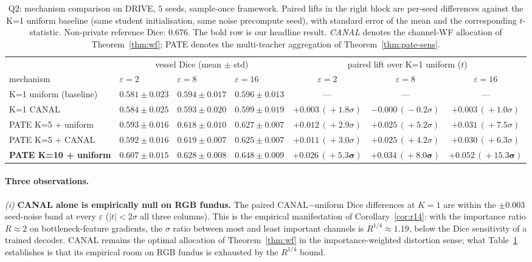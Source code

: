 \begin{table}[t]
\centering
\small
\caption{Q2: mechanism comparison on DRIVE, $5$ seeds, sample-once
framework. Paired lifts in the right block are per-seed differences
against the K=1 uniform baseline (same student initialisation, same
noise precompute seed), with standard error of the mean and the
corresponding $t$-statistic. Non-private reference Dice: $0.676$. The
bold row is our headline result. \textit{CANAL} denotes the channel-WF
allocation of Theorem~\ref{thm:wf}; PATE denotes the multi-teacher
aggregation of Theorem~\ref{thm:pate-sens}.}
\label{tab:mech}
\begin{tabular}{l l l l c c c}
\toprule
   & \multicolumn{3}{c}{vessel Dice (mean $\pm$ std)}
   & \multicolumn{3}{c}{paired lift over K=1 uniform ($t$)} \\
\cmidrule(lr){2-4}\cmidrule(lr){5-7}
mechanism
   & $\varepsilon\!=\!2$ & $\varepsilon\!=\!8$ & $\varepsilon\!=\!16$
   & $\varepsilon\!=\!2$ & $\varepsilon\!=\!8$ & $\varepsilon\!=\!16$ \\
\midrule
K=1 uniform (baseline)
   & $0.581\!\pm\!0.023$ & $0.594\!\pm\!0.017$ & $0.596\!\pm\!0.013$
   & --- & --- & --- \\
K=1 CANAL
   & $0.584\!\pm\!0.025$ & $0.593\!\pm\!0.020$ & $0.599\!\pm\!0.019$
   & $+0.003\,(\!+\!1.8\sigma)$ & $-0.000\,(\!-\!0.2\sigma)$ & $+0.003\,(\!+\!1.0\sigma)$ \\
PATE K=5 + uniform
   & $0.593\!\pm\!0.016$ & $0.618\!\pm\!0.010$ & $0.627\!\pm\!0.007$
   & $+0.012\,(\!+\!2.9\sigma)$ & $+0.025\,(\!+\!5.2\sigma)$ & $+0.031\,(\!+\!7.5\sigma)$ \\
PATE K=5 + CANAL
   & $0.592\!\pm\!0.016$ & $0.619\!\pm\!0.007$ & $0.625\!\pm\!0.007$
   & $+0.011\,(\!+\!3.0\sigma)$ & $+0.025\,(\!+\!4.2\sigma)$ & $+0.030\,(\!+\!6.3\sigma)$ \\
\midrule
\textbf{PATE K=10 + uniform}
   & $\mathbf{0.607\!\pm\!0.015}$ & $\mathbf{0.628\!\pm\!0.008}$ & $\mathbf{0.648\!\pm\!0.009}$
   & $\mathbf{+0.026\,(\!+\!5.3\sigma)}$
   & $\mathbf{+0.034\,(\!+\!8.0\sigma)}$
   & $\mathbf{+0.052\,(\!+\!15.3\sigma)}$ \\
\bottomrule
\end{tabular}
\end{table}

\paragraph{Three observations.}
\emph{(i)} \textbf{CANAL alone is empirically null on RGB fundus.} The
paired CANAL$-$uniform Dice differences at $K\!=\!1$ are within the
$\pm 0.003$ seed-noise band at every $\varepsilon$ ($|t|\!<\!2\sigma$
all three columns). This is the empirical manifestation of
Corollary~\ref{cor:r14}: with the importance ratio
$R\!\approx\!2$ on bottleneck-feature gradients, the $\sigma$ ratio
between most and least important channels is $R^{1/4}\!\approx\!1.19$,
below the Dice sensitivity of a trained decoder. CANAL remains the
optimal allocation of Theorem~\ref{thm:wf} in the importance-weighted
distortion sense; what Table~\ref{tab:mech} establishes is that its
empirical room on RGB fundus is exhausted by the $R^{1/4}$ bound.


